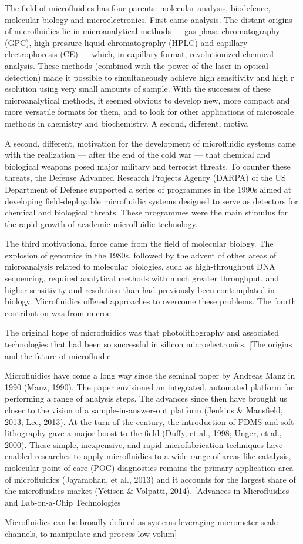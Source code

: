 The field of microfluidics has four parents: molecular analysis, biodefence, molecular biology and microelectronics. 
First came analysis. The distant origins of microfluidics lie in microanalytical methods — gas-phase chromatography (GPC), 
high-pressure liquid chromatography (HPLC) and capillary electrophoresis (CE) — which, in capillary format, revolutionized chemical analysis. These methods (combined with the power of the laser in optical detection) made it possible to simultaneously achieve high sensitivity and high r
esolution using very small amounts of sample. With the successes of these microanalytical methods, it seemed obvious to develop new, more compact and more versatile formats for them, and to look for other applications of microscale methods in chemistry and biochemistry. A second, different, motiva


A second, different, motivation for the development of microfluidic systems came with the realization — after the end of the cold war — that chemical and biological weapons posed major military and terrorist threats. To counter these threats, the Defense Advanced Research Projects Agency (DARPA)
 of the US Department of Defense supported a series of programmes in the 1990s aimed at developing field-deployable microfluidic systems designed to serve as detectors for chemical and biological threats. These programmes were the main stimulus for the rapid growth of academic microfluidic technology.

The third motivational force came from the field of molecular biology. The explosion of genomics in the 1980s, followed by the advent of other areas of microanalysis related to molecular biologies, such as high-throughput DNA sequencing, required analytical methods with much greater throughput, 
and higher sensitivity and resolution than had previously been contemplated in biology. Microfluidics offered approaches to overcome these problems. The fourth contribution was from microe


The original hope of microfluidics was that photolithography and associated 
technologies that had been so successful in silicon microelectronics,
[The origins and the future of microfluidic]

Microfluidics have come a long way since the seminal paper by Andreas Manz in 
1990 (Manz,   1990).   The   paper   envisioned   an   integrated,
   automated   platform   for performing a range of analysis steps. 
The advances since then have brought us closer to  the  vision  of  a  sample-in-answer-out  platform  (Jenkins  &  Mansfield,  2013;  Lee, 2013). At the turn of the century, the introduction of PDMS and soft lithography gave a  major  boost  to  the  field  (Duffy,  et  al.,  1998;  Unger,  et  al.,  
2000).  These  simple, inexpensive, and rapid microfabrication techniques have enabled researches to apply microfluidics  to  a  wide  range  of  areas  like  catalysis,  molecular  point-of-care  (POC) diagnostics remains the primary application area of microfluidics (Jayamohan, et al., 2013)  and  it  accounts  for  the  largest  share  of  the  microfluidics  market  (Yetisen  & Volpatti, 2014).
[Advances in Microfluidics and Lab-on-a-Chip Technologies


Microfluidics   can   be   broadly   defined   as   systems   leveraging   micrometer   scale channels,  to  manipulate  and  process  low  volum]
